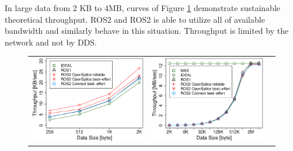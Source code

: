 \documentclass{sig-alternate-05-2015}
\begin{document}
In large data from 2 KB to 4MB, curves of Figure \ref{fig:throughput_large} demonstrate sustainable theoretical throughput.
ROS2 and ROS2 is able to utilize all of available bandwidth and similarly behave in this situation.
Throughput is limited by the network and not by DDS.

\begin{figure}[t]
  \begin{tabular}{ccc}
    \begin{minipage}[t]{0.31\textwidth}
      \includegraphics[width=1.0\linewidth]{../figure/throughput_remote_small-data.eps}
      \caption{}
      \label{fig:throughput_small}
    \end{minipage}
    &
      \begin{minipage}[t]{0.31\textwidth}
        \includegraphics[width=1.0\linewidth]{../figure/throughput_remote_large-data.eps}
        \caption{}
        \label{fig:throughput_large}
      \end{minipage}
    &
  \end{tabular}
\end{figure}
\end{document}
